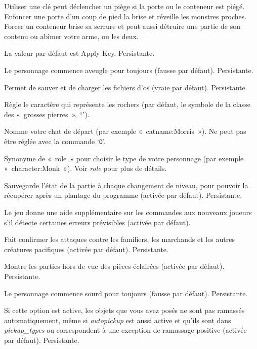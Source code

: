\documentclass[titlepage]{article}
\begin{document}
\begin{description}
Utiliser une clé peut déclencher un piège si la porte ou le conteneur est
piégé.
Enfoncer une porte d'un coup de pied la brise et réveille les monstres
proches.
Forcer un conteneur brise sa serrure et peut aussi détruire une partie de
son contenu ou abîmer votre arme, ou les deux.


La valeur par défaut est Apply-Key.
Persistante.

\item[{blind}]
Le personnage commence aveugle pour toujours (fausse par défaut).
Persistante.

\item[{bones}]
Permet de sauver et de charger les fichiers d'os (vraie par défaut).
Persistante.

\item[{boulder}]
Règle le caractère qui représente les rochers (par défaut, le symbole de la
classe des «~grosses pierres~», ``').

\item[{catname}]
Nomme votre chat de départ (par exemple «~catname:Morris~»).
Ne peut pas être réglée avec la commande `\texttt{O}'.

\item[{character}]
Synonyme de «~role~» pour choisir le type de votre personnage (par
exemple «~character:Monk~»).
Voir
\textit{role}
pour plus de détails.

\item[{checkpoint}]
Sauvegarde l'état de la partie à chaque changement de niveau, pour pouvoir
la récupérer après un plantage du programme (activée par défaut).
Persistante.

\item[{cmdassist}]
Le jeu donne une aide supplémentaire sur les commandes aux nouveaux joueurs
s'il détecte certaines erreurs prévisibles (activée par défaut).

\item[{confirm}]
Fait confirmer les attaques contre les familiers, les marchands et les
autres créatures pacifiques (activée par défaut).
Persistante.

\item[{dark\_room}]
Montre les parties hors de vue des pièces éclairées (activée par défaut).
Persistante.

\item[{deaf}]
Le personnage commence sourd pour toujours (fausse par défaut).
Persistante.

\item[{dropped\_nopick}]
Si cette option est active, les objets que vous avez posés ne sont pas
ramassés automatiquement, même si
\textit{autopickup}
est aussi active et qu'ils sont dans
\textit{pickup\_types}
ou correspondent à une exception de ramassage positive (activée par
défaut).
Persistante.


\end{description}
\end{document}
